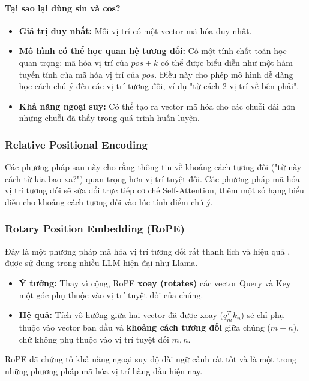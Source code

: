 \paragraph{Tại sao lại dùng sin và cos?}
\begin{itemize}
    \item \textbf{Giá trị duy nhất:} Mỗi vị trí có một vector mã hóa duy nhất.
    \item \textbf{Mô hình có thể học quan hệ tương đối:} Có một tính chất toán học quan trọng: mã hóa vị trí của $pos+k$ có thể được biểu diễn như một hàm tuyến tính của mã hóa vị trí của $pos$. Điều này cho phép mô hình dễ dàng học cách chú ý đến các vị trí tương đối, ví dụ "từ cách 2 vị trí về bên phải".
    \item \textbf{Khả năng ngoại suy:} Có thể tạo ra vector mã hóa cho các chuỗi dài hơn những chuỗi đã thấy trong quá trình huấn luyện.
\end{itemize}

\subsubsection{Relative Positional Encoding}
Các phương pháp sau này cho rằng thông tin về khoảng cách tương đối ("từ này cách từ kia bao xa?") quan trọng hơn vị trí tuyệt đối. Các phương pháp mã hóa vị trí tương đối sẽ sửa đổi trực tiếp cơ chế Self-Attention, thêm một số hạng biểu diễn cho khoảng cách tương đối vào lúc tính điểm chú ý.

\subsubsection{Rotary Position Embedding (RoPE)}
Đây là một phương pháp mã hóa vị trí tương đối rất thanh lịch và hiệu quả \cite{su2021roformer}, được sử dụng trong nhiều LLM hiện đại như Llama.
\begin{itemize}
    \item \textbf{Ý tưởng:} Thay vì cộng, RoPE \textbf{xoay (rotates)} các vector Query và Key một góc phụ thuộc vào vị trí tuyệt đối của chúng.
    \item \textbf{Hệ quả:} Tích vô hướng giữa hai vector đã được xoay ($q_m^T k_n$) sẽ chỉ phụ thuộc vào vector ban đầu và \textbf{khoảng cách tương đối} giữa chúng ($m-n$), chứ không phụ thuộc vào vị trí tuyệt đối $m, n$.
\end{itemize}
RoPE đã chứng tỏ khả năng ngoại suy độ dài ngữ cảnh rất tốt và là một trong những phương pháp mã hóa vị trí hàng đầu hiện nay.